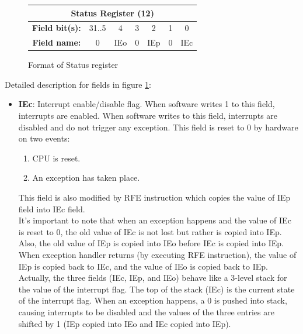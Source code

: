 \documentclass[]{scrartcl}
\begin{document}
\begin{itemize}
\begin{figure}[H]
\begin{center}
\begin{tabular}{|c|c|c|c|c|c|c|}
\hline \multicolumn{7}{|c|}{Status Register (12)} \\

\hline \textbf{Field bit(s):} & 31..5 & 4   & 3 & 2   & 1 & 0  \\

\hline \textbf{Field name:}   & 0     & IEo & 0 & IEp & 0 & IEc \\

\hline

\end{tabular}

\end{center}
\caption{Format of Status register}
\label{status_reg}
\end{figure}

Detailed description for fields in figure \ref{status_reg}:

\begin{itemize}

\item \textbf{IEc}: Interrupt enable/disable flag. When software
      writes 1 to this field, interrupts are enabled. When software
      writes to this field, interrupts are disabled and do not trigger
      any exception. This field is reset to 0 by hardware on two events:

      \begin{enumerate}
      \item CPU is reset.
      \item An exception has taken place.
      \end{enumerate}

      This field is also modified by RFE instruction which copies the
      value of IEp field into IEc field.\\

      It's important to note that when an exception happens and the
      value of IEc is reset to 0, the old value of IEc is not lost
      but rather is copied into IEp. Also, the old value of IEp
      is copied into IEo before IEc is copied into IEp. When exception
      handler returns (by executing RFE instruction), the value
      of IEp is copied back to IEc, and the value of IEo is copied
      back to IEp.\\

      Actually, the three fields (IEc, IEp, and IEo) behave like
      a 3-level stack for the value of the interrupt flag. The
      top of the stack (IEc) is the current state of the interrupt
      flag. When an exception happens, a 0 is pushed into stack,
      causing interrupts to be disabled and the values of the
      three entries are shifted by 1 (IEp copied into IEo and
      IEc copied into IEp).\\
      

\end{itemize}
\end{itemize}
\end{document}
